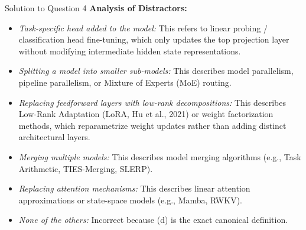 \documentclass[11pt,a4paper]{article}
\begin{document}
\begin{solutionbox}{Solution to Question 4}
\medskip
\textbf{Analysis of Distractors:}
\begin{itemize}[leftmargin=1.5cm]
    \item[\textbf{(a)}] \textit{Task-specific head added to the model:} This refers to linear probing / classification head fine-tuning, which only updates the top projection layer without modifying intermediate hidden state representations.
    \item[\textbf{(b)}] \textit{Splitting a model into smaller sub-models:} This describes model parallelism, pipeline parallelism, or Mixture of Experts (MoE) routing.
    \item[\textbf{(c)}] \textit{Replacing feedforward layers with low-rank decompositions:} This describes Low-Rank Adaptation (LoRA, Hu et al., 2021) or weight factorization methods, which reparametrize weight updates rather than adding distinct architectural layers.
    \item[\textbf{(e)}] \textit{Merging multiple models:} This describes model merging algorithms (e.g., Task Arithmetic, TIES-Merging, SLERP).
    \item[\textbf{(f)}] \textit{Replacing attention mechanisms:} This describes linear attention approximations or state-space models (e.g., Mamba, RWKV).
    \item[\textbf{(g)}] \textit{None of the others:} Incorrect because (d) is the exact canonical definition.
\end{itemize}
\end{solutionbox}

\bigskip
\end{document}
